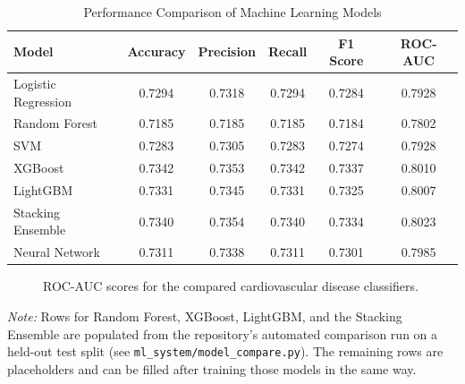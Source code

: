\begin{table}[htbp]
\centering
\caption{Performance Comparison of Machine Learning Models}
\label{tab:model_performance}
\small
\begin{tabular}{lccccc}
\hline
Model & Accuracy & Precision & Recall & F1 Score & ROC-AUC \\
\hline
Logistic Regression & 0.7294 & 0.7318 & 0.7294 & 0.7284 & 0.7928 \\
Random Forest & 0.7185 & 0.7185 & 0.7185 & 0.7184 & 0.7802 \\
SVM & 0.7283 & 0.7305 & 0.7283 & 0.7274 & 0.7928 \\
XGBoost & 0.7342 & 0.7353 & 0.7342 & 0.7337 & 0.8010 \\
LightGBM & 0.7331 & 0.7345 & 0.7331 & 0.7325 & 0.8007 \\
Stacking Ensemble & 0.7340 & 0.7354 & 0.7340 & 0.7334 & 0.8023 \\
Neural Network & 0.7311 & 0.7338 & 0.7311 & 0.7301 & 0.7985 \\
\hline
\end{tabular}
\end{table}

\begin{figure}[htbp]
\centering
{}
\caption{ROC-AUC scores for the compared cardiovascular disease classifiers.}
\label{fig:auc_bar}
\end{figure}

\noindent\textit{Note:} Rows for Random Forest, XGBoost, LightGBM, and the Stacking Ensemble are populated from the repository's automated comparison run on a held-out test split (see \texttt{ml\_system/model\_compare.py}). The remaining rows are placeholders and can be filled after training those models in the same way.

